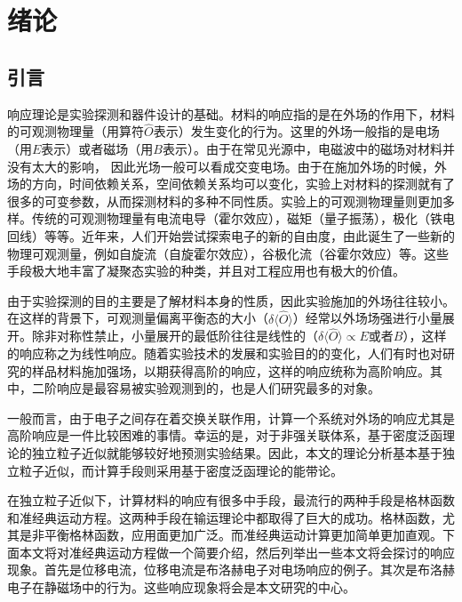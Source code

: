 \chapter{绪论}
\label{cha:intro}

\section{引言}

响应理论是实验探测和器件设计的基础。材料的响应指的是在外场的作用下，材料的可观测物理量（用算符$\hat{O}$表示）发生变化的行为。这里的外场一般指的是电场（用$E$表示）或者磁场（用$B$表示）。由于在常见光源中，电磁波中的磁场对材料并没有太大的影响， 因此光场一般可以看成交变电场。由于在施加外场的时候，外场的方向，时间依赖关系，空间依赖关系均可以变化，实验上对材料的探测就有了很多的可变参数，从而探测材料的多种不同性质。实验上的可观测物理量则更加多样。传统的可观测物理量有电流电导（霍尔效应\cite{klitzing_new_1980}），磁矩（量子振荡\cite{SdH,dHvA}），极化（铁电回线\cite{cohen_origin_1992}）等等。近年来，人们开始尝试探索电子的新的自由度，由此诞生了一些新的物理可观测量，例如自旋流（自旋霍尔效应\cite{hasan2010,qi2011}），谷极化流（谷霍尔效应\cite{xiao_coupled_2012}）等。这些手段极大地丰富了凝聚态实验的种类，并且对工程应用也有极大的价值。


由于实验探测的目的主要是了解材料本身的性质，因此实验施加的外场往往较小。在这样的背景下，可观测量偏离平衡态的大小（$\delta\langle\hat{O}\rangle$）经常以外场场强进行小量展开。除非对称性禁止，小量展开的最低阶往往是线性的（$\delta\langle\hat{O}\rangle \propto E$或者$B$），这样的响应称之为线性响应。随着实验技术的发展和实验目的的变化，人们有时也对研究的样品材料施加强场，以期获得高阶的响应，这样的响应统称为高阶响应。其中，二阶响应是最容易被实验观测到的，也是人们研究最多的对象。

一般而言，由于电子之间存在着交换关联作用，计算一个系统对外场的响应尤其是高阶响应是一件比较困难的事情。幸运的是，对于非强关联体系，基于密度泛函理论的独立粒子近似就能够较好地预测实验结果。因此，本文的理论分析基本基于独立粒子近似，而计算手段则采用基于密度泛函理论的能带论。

在独立粒子近似下，计算材料的响应有很多中手段，最流行的两种手段是格林函数和准经典运动方程\cite{xiao_berry_2010}。这两种手段在输运理论中都取得了巨大的成功。格林函数，尤其是非平衡格林函数，应用面更加广泛。而准经典运动计算更加简单更加直观。下面本文将对准经典运动方程做一个简要介绍，然后列举出一些本文将会探讨的响应现象。首先是位移电流\cite{sipe_second-order_2000,von_baltz_theory_1981}，位移电流是布洛赫电子对电场响应的例子。其次是布洛赫电子在静磁场中的行为。这些响应现象将会是本文研究的中心。

